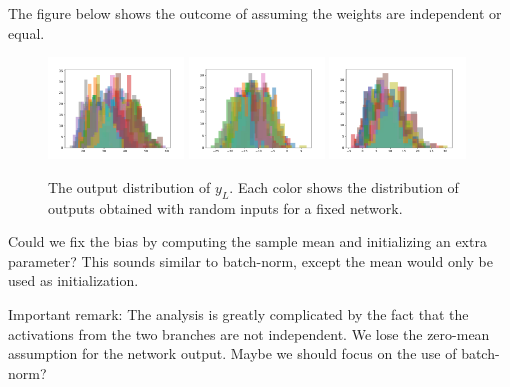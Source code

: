 
The figure below shows the outcome of assuming the weights are independent or equal.

\begin{figure}[H]
\centering
\includegraphics[width=36mm]{figures/siamese_hist_independent}
\includegraphics[width=36mm]{figures/siamese_hist_equal}
\includegraphics[width=36mm]{figures/siamese_hist_compromise}
\caption{
  The output distribution of $y_{L}$.
  Each color shows the distribution of outputs obtained with random inputs for a fixed network.
}
\end{figure}

Could we fix the bias by computing the sample mean and initializing an extra parameter?
This sounds similar to batch-norm, except the mean would only be used as initialization.

Important remark: The analysis is greatly complicated by the fact that the activations from the two branches are not independent.
We lose the zero-mean assumption for the network output.
Maybe we should focus on the use of batch-norm?

